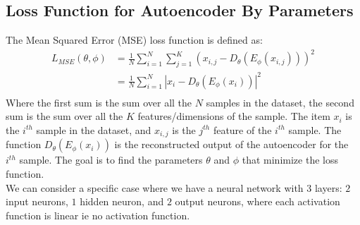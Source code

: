 \documentclass[answers,12pt,addpoints]{exam}
\begin{document}
\subsection{Loss Function for Autoencoder By Parameters}
The Mean Squared Error (MSE) loss function is defined as:
\begin{align*}
    L_{MSE}(\theta, \phi) &= \frac{1}{N} \sum_{i=1}^{N} \sum_{j=1}^{K} (x_{i,j} - D_\theta(E_\phi(x_{i,j})))^2  \\
    &= \frac{1}{N} \sum_{i=1}^{N} \left| x_i - D_\theta(E_\phi(x_i)) \right|^2 \\
\end{align*}
Where the first sum is the sum over all the $N$ samples in the dataset, the second sum is the sum over all the $K$ features/dimensions of the sample. The item $x_{i}$ is the $i^{th}$ sample in the dataset, and $x_{i,j}$ is the $j^{th}$ feature of the $i^{th}$ sample. The function $D_\theta(E_\phi(x_i))$ is the reconstructed output of the autoencoder for the $i^{th}$ sample. The goal is to find the parameters $\theta$ and $\phi$ that minimize the loss function. \\
We can consider a specific case where we have a neural network with $3$ layers: $2$ input neurons, $1$ hidden neuron, and $2$ output neurons, where each activation function is linear ie no activation function. 
\begin{center}
\end{center}
\end{document}
